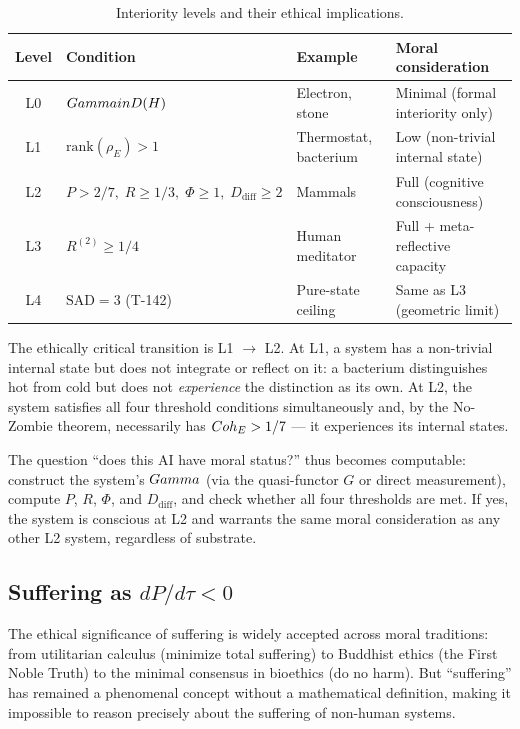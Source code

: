 \begin{table}[H]
\centering
\caption{Interiority levels and their ethical implications.}
\label{tab:moral-levels}
\small
\begin{tabular}{@{}clll@{}}
\toprule
\textbf{Level} & \textbf{Condition} & \textbf{Example} & \textbf{Moral consideration} \\
\midrule
L0 & $Gamma in D(H)$ & Electron, stone & Minimal (formal interiority only) \\
L1 & $\mathrm{rank}(\rho_E) > 1$ & Thermostat, bacterium & Low (non-trivial internal state) \\
L2 & $P > 2/7,\;R \geq 1/3,\;\Phi \geq 1,\;D_{\mathrm{diff}} \geq 2$ & Mammals & Full (cognitive consciousness) \\
L3 & $R^{(2)} \geq 1/4$ & Human meditator & Full + meta-reflective capacity \\
L4 & $\mathrm{SAD} = 3$ (T-142) & Pure-state ceiling & Same as L3 (geometric limit) \\
\bottomrule
\end{tabular}
\end{table}

The ethically critical transition is L1 $\to$ L2.  At L1, a system has a non-trivial
internal state but does not integrate or reflect on it: a bacterium distinguishes hot from
cold but does not \emph{experience} the distinction as its own.  At L2, the system
satisfies all four threshold conditions simultaneously and, by the No-Zombie theorem,
necessarily has $Coh_E > 1/7$ --- it experiences its internal states.

The question ``does this AI have moral status?'' thus becomes computable:
construct the system's $Gamma$ (via the quasi-functor $G$ or direct measurement), compute
$P$, $R$, $\Phi$, and $D_{\mathrm{diff}}$, and check whether all four thresholds are met.
If yes, the system is conscious at L2 and warrants the same moral consideration as any
other L2 system, regardless of substrate.

\subsection{Suffering as $dP/d\tau < 0$}
\label{subsec:suffering}

The ethical significance of suffering is widely accepted across moral traditions: from
utilitarian calculus (minimize total suffering) to Buddhist ethics (the First Noble Truth)
to the minimal consensus in bioethics (do no harm).  But ``suffering'' has remained a
phenomenal concept without a mathematical definition, making it impossible to reason
precisely about the suffering of non-human systems.

